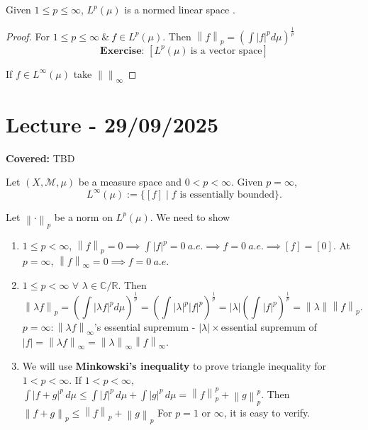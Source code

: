\documentclass{functionspaces}
\begin{document}
\begin{theorem}\label{thm:Lp_normed_space}
Given $1\leq p\leq\infty$, $L^{p}(\mu)$ is a normed linear space .
\end{theorem}

\begin{proof}
For $1\leq p\leq\infty\ \&\ f\in L^{p}(\mu)$. Then $\left\|f\right\|_{p}=\left(\int\left|f\right|^{p}d\mu\right)^{\frac{1}{p}}$ 
$$\textbf{Exercise: }\left[L^{p}(\mu)\ \text{is a vector space}\right]$$

If $f\in L^{\infty}(\mu)$ take $\left\|\right\|_{\infty}$
\end{proof}

\setlength{\parindent}{0pt}
\endgroup

\newpage
\section{Lecture - 29/09/2025}

\textbf{Covered:} TBD

\begingroup
\setlength{\parskip}{6pt}

Let $(X,\mathcal{M},\mu)$ be a measure space and $0<p<\infty$. Given $p=\infty$,
\[
L^{\infty}(\mu):=\{[f]\mid f\text{ is essentially bounded}\}.
\]

Let $\left\|\cdot\right\|_{p}$ be a norm on $L^{p}(\mu)$. We need to show

\begin{enumerate}
\item $1\leq p<\infty$, $\left\|f\right\|_{p}=0\implies\int|f|^{p}=0\ a.e.\implies f=0\ a.e.\implies[f]=[0].$ At $p=\infty$, $\left\|f\right\|_{\infty}=0\implies f=0\ a.e.$

\item $1\leq p<\infty$ $\forall$ $\lambda\in\mathbb{C}/\mathbb{R}$. Then
\[
\left\|\lambda f\right\|_{p}=\left(\int\left|\lambda f\right|^{p}d\mu\right)^{\frac{1}{p}}=\left(\int\left|\lambda\right|^{p}|f|^{p}\right)^{\frac{1}{p}}=|\lambda|\left(\int|f|^{p}\right)^{\frac{1}{p}}=\left\|\lambda\right\|\left\|f\right\|_{p}.
\]
$p=\infty:\left\|\lambda f\right\|_{\infty}$'s essential supremum - $|\lambda|\times$essential supremum of $|f|=\left\|\lambda f\right\|_{\infty}=\left\|\lambda\right\|_{\infty}\left\|f\right\|_{\infty}$.

\item We will use \textbf{Minkowski's inequality} to prove triangle inequality for $1<p<\infty$. If $1<p<\infty$, $\int|f+g|^{p}\,d\mu\leq\int|f|^{p}\,d\mu+\int|g|^{p}\,d\mu=\left\|f\right\|_{p}^{p}+\left\|g\right\|_{p}^{p}.$ Then $\left\|f+g\right\|_{p}\leq\left\|f\right\|_{p}+\left\|g\right\|_{p}$ For $p=1$ or $\infty$, it is easy to verify.
\end{enumerate}
\end{document}
